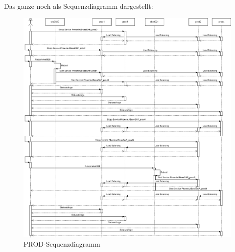 \begin{flushleft}
    Das ganze noch als Sequenzdiagramm dargestellt:
    \begin{figure}[H]
        \centering
        \includegraphics[width=1\linewidth]{source/prod/sequenzdiagramm_prod}
        \caption{PROD-Sequenzdiagramm}
        \label{fig:prod-sequenzdiagramm}
    \end{figure}
\end{flushleft}